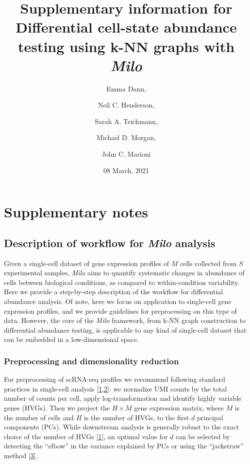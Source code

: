 \documentclass[
]{article}
\title{Supplementary information for
\textbf{Differential cell-state abundance testing using k-NN graphs with \emph{Milo}}}
\author{Emma Dann, \and Neil C. Henderson, \and Sarah A. Teichmann, \and Michael D. Morgan, \and John C. Marioni}
\date{08 March, 2021}
\begin{document}
\maketitle

{
\setcounter{tocdepth}{3}
\tableofcontents
}
\renewcommand{\figurename}{Supplementary Figure}

\newpage

\hypertarget{supplementary-notes}{%
\section{Supplementary notes}\label{supplementary-notes}}

\hypertarget{description-of-workflow-for-milo-analysis}{%
\subsection{\texorpdfstring{Description of workflow for \emph{Milo} analysis}{Description of workflow for Milo analysis}}\label{description-of-workflow-for-milo-analysis}}

Given a single-cell dataset of gene expression profiles of \(M\) cells collected from \(S\) experimental samples, \emph{Milo} aims to quantify systematic changes in abundance of cells between biological conditions, as compared to within-condition variability. Here we provide a step-by-step description of the workflow for differential abundance analysis. Of note, here we focus on application to single-cell gene expression profiles, and we provide guidelines for preprocessing on this type of data. However, the core of the \emph{Milo} framework, from k-NN graph construction to differential abundance testing, is applicable to any kind of single-cell dataset that can be embedded in a low-dimensional space.

\hypertarget{pp}{%
\subsubsection{Preprocessing and dimensionality reduction}\label{pp}}

For preprocessing of scRNA-seq profiles we recommend following standard practices in single-cell analysis {[}\protect\hyperlink{ref-lueckenCurrentBestPractices2019}{1},\protect\hyperlink{ref-amezquitaOrchestratingSinglecellAnalysis2020}{2}{]}: we normalize UMI counts by the total number of counts per cell, apply log-transformation and identify highly variable genes (HVGs). Then we project the \(H \times M\) gene expression matrix, where \(M\) is the number of cells and \(H\) is the number of HVGs, to the first \(d\) principal components (PCs). While downstream analysis is generally robust to the exact choice of the number of HVGs {[}\protect\hyperlink{ref-lueckenCurrentBestPractices2019}{1}{]}, an optimal value for \(d\) can be selected by detecting the ``elbow'' in the variance explained by PCs or using the ``jackstraw'' method {[}\protect\hyperlink{ref-chungStatisticalSignificanceVariables2015}{3}{]}.
\end{document}
